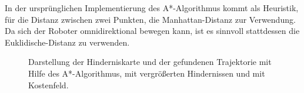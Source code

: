 In der ursprünglichen Implementierung des A*-Algorithmus kommt als Heuristik, für die Distanz zwischen zwei Punkten, die \gls{Manhattan-Distanz} zur Verwendung.
Da sich der Roboter omnidirektional bewegen kann, ist es sinnvoll stattdessen die \gls{Euklidische-Distanz} zu verwenden.
\begin{figure}[h]
	\centering
	\label{fig:bahnplanung_umsetzung_algorithm}
	\quad
	\quad
	\caption[Hinderniskarte und Trajektorie mit A*-Alg.]{Darstellung der Hinderniskarte und der gefundenen Trajektorie mit Hilfe des A*-Algorithmus, mit vergrößerten Hindernissen und mit Kostenfeld.}
\end{figure}
